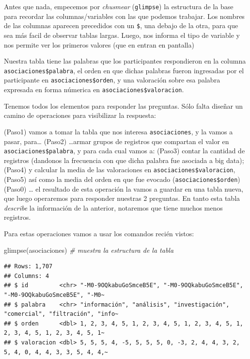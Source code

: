 \documentclass[
]{book}
\newenvironment{Shaded}{\begin{snugshade}}{\end{snugshade}}
\newcommand{\CommentTok}[1]{\textcolor[rgb]{0.56,0.35,0.01}{\textit{#1}}}
\newcommand{\FunctionTok}[1]{\textcolor[rgb]{0.00,0.00,0.00}{#1}}
\newcommand{\NormalTok}[1]{#1}
\begin{document}
Antes que nada, empecemos por \emph{chusmear} (\texttt{glimpse}) la estructura de la base para recordar las columnas/variables con las que podemos trabajar. Los nombres de las columnas aparecen precedidos con un \texttt{\$}, una debajo de la otra, para que sea más facil de observar tablas largas. Luego, nos informa el tipo de variable y nos permite ver los primeros valores (que en entran en pantalla)

Nuestra tabla tiene las palabras que los participantes respondieron en la columna \texttt{asociaciones\$palabra}, el orden en que dichas palabras fueron ingresadas por el participante en \texttt{asociaciones\$orden}, y una valoración sobre esa palabra expresada en forma númerica en \texttt{asociaciones\$valoracion}.

Tenemos todos los elementos para responder las preguntas. Sólo falta diseñar un camino de operaciones para visibilizar la respuesta:

(Paso1) vamos a tomar la tabla que nos interesa \texttt{asociaciones}, y la vamos a pasar, para\ldots{}
(Paso2) \ldots armar grupos de registros que compartan el valor en \texttt{asociaciones\$palabra}, y para cada cual vamos a:
(Paso3) contar la cantidad de registros (dandonos la frecuencia con que dicha palabra fue asociada a big data);
(Paso4) y calcular la media de las valoraciones en \texttt{asociaciones\$valoracion},
(Paso5) así como la media del orden en que fue evocado (\texttt{asociaciones\$orden})
(Paso0) \ldots{} el resultado de esta operación la vamos a guardar en una tabla nueva, que luego operaremos para responder nuestras 2 preguntas. En tanto esta tabla \emph{describe} la información de la anterior, notaremos que tiene muchos menos registros.

Para estas operaciones vamos a usar los comandos recién vistos:

\begin{Shaded}
\begin{Highlighting}[]
\FunctionTok{glimpse}\NormalTok{(asociaciones) }\CommentTok{\# muestra la estructura de la tabla }
\end{Highlighting}
\end{Shaded}

\begin{verbatim}
## Rows: 1,707
## Columns: 4
## $ id         <chr> "-M0-9OQkabuGoSmceB5E", "-M0-9OQkabuGoSmceB5E", "-M0-9OQkabuGoSmceB5E", "-M0~
## $ palabra    <chr> "información", "análisis", "investigación", "comercial", "filtración", "info~
## $ orden      <dbl> 1, 2, 3, 4, 5, 1, 2, 3, 4, 5, 1, 2, 3, 4, 5, 1, 2, 3, 4, 5, 1, 2, 3, 4, 5, 1~
## $ valoracion <dbl> 5, 5, 5, 4, -5, 5, 5, 5, 0, -3, 2, 4, 4, 3, 2, 5, 4, 0, 4, 4, 3, 3, 5, 4, 4,~
\end{verbatim}
\end{document}
